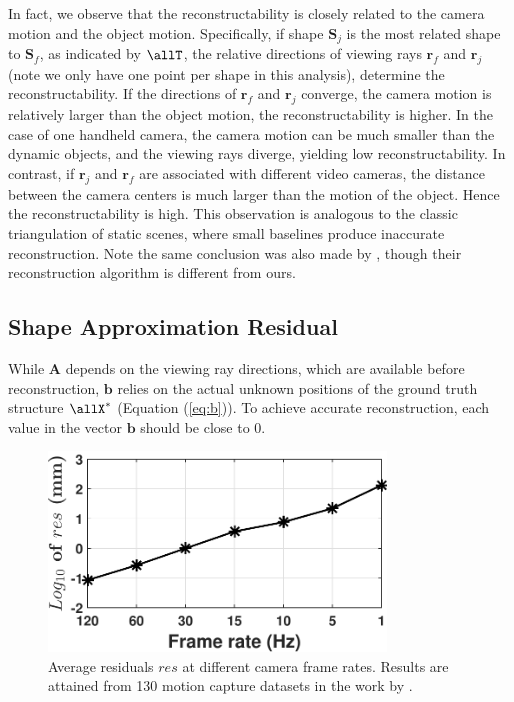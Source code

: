 In fact, we observe that the reconstructability is closely related to the camera motion and the object motion. 
Specifically, if shape $\mathbf{S}_j$ is the most related shape to $\mathbf{S}_f$, as indicated by $\allT$, the relative directions of viewing rays $\mathbf{r}_f$ and $\mathbf{r}_j$ (note we only have one point per shape in this analysis), determine the reconstructability. If the directions of $\mathbf{r}_f$ and $\mathbf{r}_j$ converge, \ie the camera motion is relatively larger than the object motion, the reconstructability is higher. 
In the case of one handheld camera, the camera motion can be much smaller than the dynamic objects, and the viewing rays diverge, yielding low reconstructability. In contrast, if $\mathbf{r}_j$ and $\mathbf{r}_f$ are associated with different video cameras, the distance between the camera centers is much larger than the motion of the object. Hence the reconstructability is high.
This observation is analogous to the classic triangulation of static scenes, where small baselines produce inaccurate reconstruction. Note the same conclusion was also made by \citet{park20153d}, though their reconstruction algorithm is different from ours.



\subsection{Shape Approximation Residual} \label{sec:shape_approximation}
While $\mathbf{A}$ depends on the viewing ray directions, which are available before reconstruction, 
$\mathbf{b}$ relies on the actual unknown positions of the ground truth structure $\allX^*$ (Equation (\ref{eq:b})). 
To achieve accurate reconstruction, each value in the vector $\mathbf{b}$ should be close to 0. 

\begin{figure}
\centering
\includegraphics[width=0.80\textwidth]{chapter5/resource/residual.pdf}
\caption[Average residual at differernt camera frame rates.]{Average residuals $res$ at different camera frame rates. Results are attained from 130 motion capture datasets in the work by \citet{cg-2007-2}.}
\label{fig:residual}
\end{figure}

